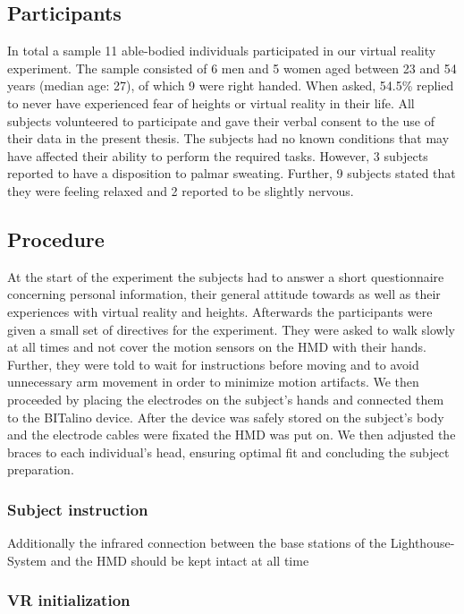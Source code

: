 \subsection{Participants}
In total a sample 11 able-bodied individuals participated in our virtual reality experiment. The sample consisted of 6 men and 5 women aged between 23 and 54 years (median age: 27), of which 9 were right handed. When asked, 54.5\% replied to never have experienced fear of heights or virtual reality in their life. All subjects volunteered to participate and gave their verbal consent to the use of their data in the present thesis. The subjects had no known conditions that may have affected their ability to perform the required tasks. However, 3 subjects reported to have a disposition to palmar sweating. Further, 9 subjects stated that they were feeling relaxed and 2 reported to be slightly nervous.

\subsection{Procedure}
At the start of the experiment the subjects had to answer a short questionnaire concerning personal information, their general attitude towards as well as their experiences with virtual reality and heights. Afterwards the participants were given a small set of directives for the experiment. They were asked to walk slowly at all times and not cover the motion sensors on the HMD with their hands. Further, they were told to wait for instructions before moving and to avoid unnecessary arm movement in order to minimize motion artifacts. We then proceeded by placing the electrodes on the subject's hands and connected them to the BITalino device. After the device was safely stored on the subject's body and the electrode cables were fixated the HMD was put on. We then adjusted the braces to each individual's head, ensuring optimal fit and concluding the subject preparation.\\


\subsubsection{Subject instruction}
Additionally the infrared connection between the base stations of the Lighthouse-System and the HMD should be kept intact at all time
\subsubsection{VR initialization}

